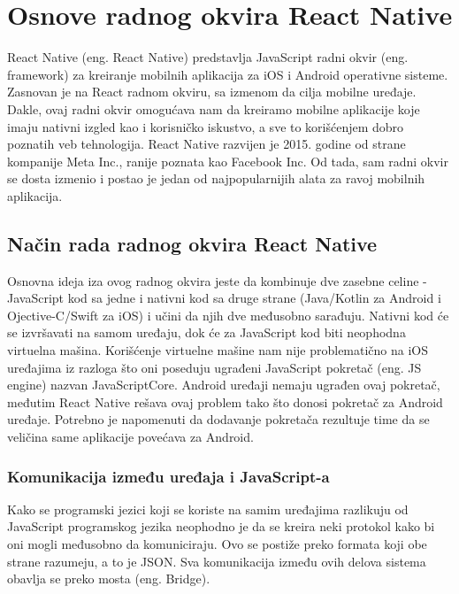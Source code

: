 \documentclass[12pt,oneside]{memoir}
\begin{document}
\chapter{Osnove radnog okvira React Native}

React Native\cite[22]{reactNative} (eng. React Native) predstavlja JavaScript radni okvir (eng. framework) za kreiranje mobilnih aplikacija za iOS i Android operativne sisteme. Zasnovan je na React radnom okviru, sa izmenom da cilja mobilne uređaje. Dakle, ovaj radni okvir omogućava nam da kreiramo mobilne aplikacije koje imaju nativni izgled kao i korisničko iskustvo, a sve to korišćenjem dobro poznatih veb tehnologija. React Native razvijen je 2015. godine od strane kompanije Meta Inc., ranije poznata kao Facebook Inc. Od tada, sam radni okvir se dosta izmenio i postao je jedan od najpopularnijih alata za ravoj mobilnih aplikacija.

\section{Način rada radnog okvira React Native}

Osnovna ideja iza ovog radnog okvira jeste da kombinuje dve zasebne celine - JavaScript kod sa jedne i nativni kod sa druge strane (Java/Kotlin za Android \cite{javaVsKotlin} i Ojective-C/Swift za iOS\cite{swiftVsObjectiveC}) i učini da njih dve međusobno sarađuju. Nativni kod će se izvršavati na samom uređaju, dok će za JavaScript kod biti neophodna virtuelna mašina. Korišćenje virtuelne mašine nam nije problematično na iOS uređajima iz razloga što oni poseduju ugrađeni JavaScript pokretač (eng. JS engine) nazvan JavaScriptCore\cite{JSCore}. Android uređaji nemaju ugrađen ovaj pokretač, međutim React Native rešava ovaj problem tako što donosi pokretač za Android uređaje. Potrebno je napomenuti da dodavanje pokretača rezultuje time da se veličina same aplikacije povećava za Android.

\subsection{Komunikacija između uređaja i JavaScript-a}

Kako se programski jezici koji se koriste na samim uređajima razlikuju od JavaScript programskog jezika neophodno je da se kreira neki protokol kako bi oni mogli međusobno da komuniciraju. Ovo se postiže preko formata koji obe strane razumeju, a to je JSON\cite{JSON}. Sva komunikacija između ovih delova sistema obavlja se preko mosta (eng. Bridge).
\end{document}
